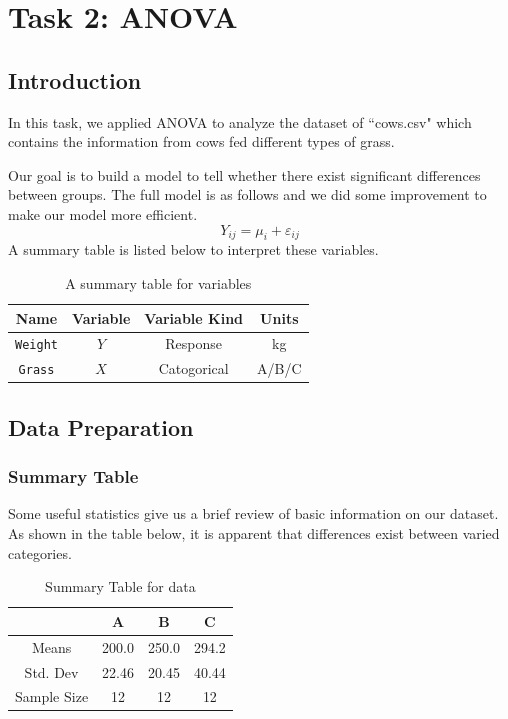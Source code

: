 \documentclass[a4paper,11pt,onecolumn,twoside]{article}
\begin{document}
\section{Task 2: ANOVA}
\subsection{Introduction}
In this task, we applied ANOVA to analyze the dataset of ``cows.csv" which contains the information from cows fed different types of grass.\par
Our goal is to build a model to tell whether there exist significant differences between groups. The full model is as follows and we did some improvement to make our model more efficient.
\begin{equation}
Y_{ij}=\mu_i+\varepsilon_{ij}
\end{equation}
A summary table is listed below to interpret these variables. 
\begin{table}[htbp]
	\centering
	\begin{tabular}{cccc}
		\midrule[1.5pt]
		Name& Variable &Variable Kind  & Units\\
		\hline
		\texttt{Weight}&$Y$ & Response  & kg\\
		\texttt{Grass} &$X$& Catogorical  & A/B/C  \\
		\midrule[1.5pt]
	\end{tabular}
	\caption{A summary table for variables }
\end{table}
\subsection{Data Preparation}
\subsubsection{Summary Table}
Some useful statistics give us a brief review of basic information on our dataset. As shown in the table below, it is apparent that differences exist between varied categories.
\begin{table}[H]
	\centering
	\begin{tabular}{cccc}
		\midrule[1.5pt]	
		&A &B &C\\
		\hline
		Means&200.0&250.0&294.2\\
		Std. Dev&22.46&20.45&40.44\\			Sample Size &12&12&12\\
		\midrule[1.5pt]
	\end{tabular}
	\caption{Summary Table for data}
\end{table}
\end{document}
